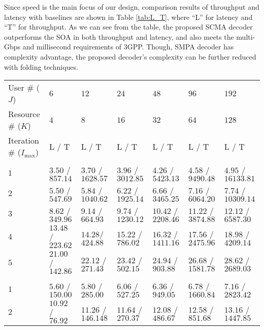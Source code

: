 \documentclass[journal,twoside]{IEEEtran}
\begin{document}
Since speed is the main focus of our design, comparison results of throughput and latency with baselines are shown in Table \ref{tab:L_T}, where ``L'' for latency and ``T'' for throughput. As we can see from the table, the proposed SCMA decoder outperforms the SOA in both throughput and latency, and also meets the multi-Gbps and millisecond requirements of 3GPP. Though, SMPA decoder has complexity advantage, the proposed decoder's complexity can be further reduced with folding techniques.
\begin{table*}[htbp]
\centering
\renewcommand\arraystretch{1.2}
\footnotesize
\caption{\label{tab:L_T}Latency (L) in [$\mu$s] and Throughput (T) in [mb/s] for Different Decoders (Frequency: $500$ MHz)}
\begin{tabular}{lllllll}
\Xhline{1.0pt}
\rowcolor{gray!15}
User \# ($J$) & $6$ & $12$ & $24$ & $48$ & $96$ & $192$\\
Resource \# ($K$) & $4$ & $8$ & $16$ & $32$ & $64$ & $128$\\
\rowcolor{gray!15}
Iteration \# ($I_{\mathrm{max}}$) & L / T & L / T & L / T & L / T & L / T & L / T\\
\Xhline{.5pt}
\multicolumn{7}{c}{This work}\\
\Xhline{.5pt}
\rowcolor{gray!15}$1$ & $3.50$ / $857.14$ & $3.70$ / $1628.57$ & $3.96$ / $3012.85$ & $4.26$ / $5423.13$ & $4.58$ / $9490.48$ & $4.95$ / $16133.81$\\
$2$ & $5.50$ / $547.69$ & $5.84$ / $1040.62$ & $6.22$ / $1925.14$ & $6.66$ / $3465.25$ & $7.16$ / $6064.20$ & $7.74$ / $10309.14$\\
\rowcolor{gray!15}$3$ & $8.62$ / $349.96$ & $9.14$ / $664.93$ & $9.74$ / $1230.12$ & $10.42$ / $2208.46$ & $11.22$ / $3874.88$ & $12.12$ / $6587.30$\\
$4$ & $13.48$ / $223.62$ & $14.28$/ $424.88$ & $15.22$ / $786.02$ & $16.32$ / $1411.16$ & $17.56$ / $2475.96$ & $18.98$ / $4209.14$\\
\rowcolor{gray!15}$5$ & $21.00$ / $142.86$ & $22.12$ / $271.43$ & $23.42$ / $502.15$ & $24.94$ / $903.88$ & $26.68$ / $1581.78$ & $28.62$ / $2689.03$\\
\Xhline{.5pt}
\multicolumn{7}{c}{C. Yang \cite{SCMA_archi}, [DMPA decoder, APCCAS '17]} \\ \hline
\rowcolor{gray!15}$1$ & $5.60$ / $150.00$ & $5.80$ / $285.00$ & $6.06$ / $527.25$ & $6.36$ / $949.05$ & $6.78$ / $1660.84$ & $7.16$ / $2823.42$\\
$2$ & $10.92$ / $76.92$ & $11.26$ / $146.148$ & $11.64$ / $270.37$ & $12.08$ / $486.67$ & $12.58$ / $851.68$ & $13.16$ / $1447.85$\\

\end{tabular}
\end{table*}
\end{document}
